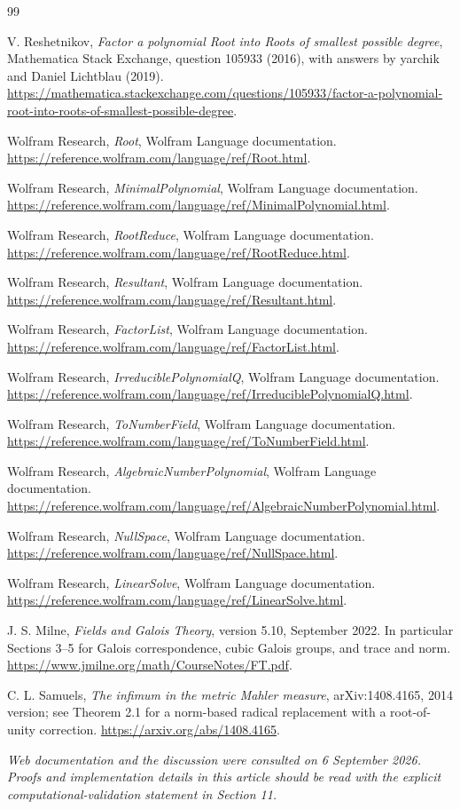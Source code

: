 \documentclass[11pt,letterpaper]{article}
\theoremstyle{definition}
\begin{document}
\begin{thebibliography}{99}
\raggedright
{}
V. Reshetnikov, \emph{Factor a polynomial Root into Roots of smallest possible degree}, Mathematica Stack Exchange, question 105933 (2016), with answers by yarchik and Daniel Lichtblau (2019).
\url{https://mathematica.stackexchange.com/questions/105933/factor-a-polynomial-root-into-roots-of-smallest-possible-degree}.

Wolfram Research, \emph{Root}, Wolfram Language documentation.
\url{https://reference.wolfram.com/language/ref/Root.html}.

Wolfram Research, \emph{MinimalPolynomial}, Wolfram Language documentation.
\url{https://reference.wolfram.com/language/ref/MinimalPolynomial.html}.

Wolfram Research, \emph{RootReduce}, Wolfram Language documentation.
\url{https://reference.wolfram.com/language/ref/RootReduce.html}.

Wolfram Research, \emph{Resultant}, Wolfram Language documentation.
\url{https://reference.wolfram.com/language/ref/Resultant.html}.

Wolfram Research, \emph{FactorList}, Wolfram Language documentation.
\url{https://reference.wolfram.com/language/ref/FactorList.html}.

Wolfram Research, \emph{IrreduciblePolynomialQ}, Wolfram Language documentation.
\url{https://reference.wolfram.com/language/ref/IrreduciblePolynomialQ.html}.

Wolfram Research, \emph{ToNumberField}, Wolfram Language documentation.
\url{https://reference.wolfram.com/language/ref/ToNumberField.html}.

Wolfram Research, \emph{AlgebraicNumberPolynomial}, Wolfram Language documentation.
\url{https://reference.wolfram.com/language/ref/AlgebraicNumberPolynomial.html}.

Wolfram Research, \emph{NullSpace}, Wolfram Language documentation.
\url{https://reference.wolfram.com/language/ref/NullSpace.html}.

Wolfram Research, \emph{LinearSolve}, Wolfram Language documentation.
\url{https://reference.wolfram.com/language/ref/LinearSolve.html}.

J. S. Milne, \emph{Fields and Galois Theory}, version 5.10, September 2022. In particular Sections 3--5 for Galois correspondence, cubic Galois groups, and trace and norm.
\url{https://www.jmilne.org/math/CourseNotes/FT.pdf}.

C. L. Samuels, \emph{The infimum in the metric Mahler measure}, arXiv:1408.4165, 2014 version; see Theorem 2.1 for a norm-based radical replacement with a root-of-unity correction.
\url{https://arxiv.org/abs/1408.4165}.
\end{thebibliography}
\medskip
\small\textit{Web documentation and the discussion were consulted on 6 September 2026. Proofs and implementation details in this article should be read with the explicit computational-validation statement in Section 11.}
\end{document}
